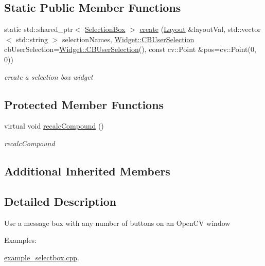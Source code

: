 \subsection*{Static Public Member Functions}
\begin{DoxyCompactItemize}
\item 
static std\+::shared\+\_\+ptr$<$ \hyperlink{classcanvascv_1_1SelectionBox}{Selection\+Box} $>$ \hyperlink{classcanvascv_1_1SelectionBox_af1f8e0c480d006706bc5240cd1ebd075}{create} (\hyperlink{classcanvascv_1_1Layout}{Layout} \&layout\+Val, std\+::vector$<$ std\+::string $>$ selection\+Names, \hyperlink{classcanvascv_1_1Widget_a977cbd39cf203c5866f07f3645c7e4bc}{Widget\+::\+C\+B\+User\+Selection} cb\+User\+Selection=\hyperlink{classcanvascv_1_1Widget_a977cbd39cf203c5866f07f3645c7e4bc}{Widget\+::\+C\+B\+User\+Selection}(), const cv\+::\+Point \&pos=cv\+::\+Point(0, 0))
\begin{DoxyCompactList}\small\item\em create a selection box widget \end{DoxyCompactList}\end{DoxyCompactItemize}
\subsection*{Protected Member Functions}
\begin{DoxyCompactItemize}
\item 
virtual void \hyperlink{classcanvascv_1_1SelectionBox_a78bf141cda79618e972f173627d07e1a}{recalc\+Compound} ()
\begin{DoxyCompactList}\small\item\em recalc\+Compound \end{DoxyCompactList}\end{DoxyCompactItemize}
\subsection*{Additional Inherited Members}


\subsection{Detailed Description}
Use a message box with any number of buttons on an Open\+CV window \begin{Desc}
\item[Examples\+: ]\par
\hyperlink{example_selectbox_8cpp-example}{example\+\_\+selectbox.\+cpp}.\end{Desc}


